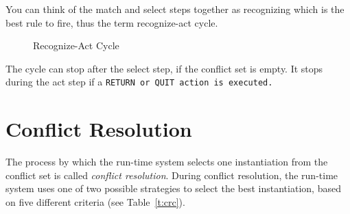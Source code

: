 You can think of the match and select steps together as recognizing
which is the best rule to fire, thus the term recognize-act cycle.

\begin{figure}[h]
  \centering
  
  \caption{Recognize-Act Cycle}
  \label{f:1-3}
\end{figure}

The cycle can stop after the select step, if the conflict set is
empty. It stops during the act step if a \tt{RETURN} or \tt{QUIT}
action is executed.

\section{Conflict Resolution}

The process by which the run-time system selects one instantiation
from the conflict set is called \emph{conflict resolution}. During
conflict resolution, the run-time system uses one of two possible
strategies to select the best instantiation, based on five different
criteria (see Table~\ref{t:crc}).

